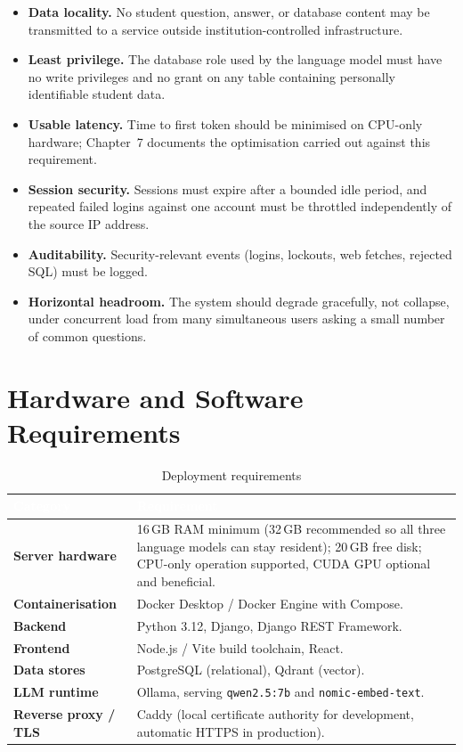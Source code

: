 \documentclass[11pt,a4paper,oneside]{report}
\begin{document}
\begin{itemize}[leftmargin=1.5em]
\item \textbf{Data locality.} No student question, answer, or database
      content may be transmitted to a service outside institution-controlled
      infrastructure.
\item \textbf{Least privilege.} The database role used by the language
      model must have no write privileges and no grant on any table
      containing personally identifiable student data.
\item \textbf{Usable latency.} Time to first token should be minimised on
      CPU-only hardware; Chapter~7 documents the optimisation carried out
      against this requirement.
\item \textbf{Session security.} Sessions must expire after a bounded idle
      period, and repeated failed logins against one account must be
      throttled independently of the source IP address.
\item \textbf{Auditability.} Security-relevant events (logins, lockouts,
      web fetches, rejected SQL) must be logged.
\item \textbf{Horizontal headroom.} The system should degrade gracefully,
      not collapse, under concurrent load from many simultaneous users
      asking a small number of common questions.
\end{itemize}

\section{Hardware and Software Requirements}

\begin{table}[h]
\centering
\caption{Deployment requirements}
\renewcommand{\arraystretch}{1.3}
\begin{tabularx}{\linewidth}{|>{\bfseries}p{3.4cm}|X|}
\hline
\rowcolor{hdrnavy}
\textcolor{white}{Category} & \textcolor{white}{Requirement} \\
\hline
Server hardware & 16\,GB RAM minimum (32\,GB recommended so all three
  language models can stay resident); 20\,GB free disk; CPU-only
  operation supported, CUDA GPU optional and beneficial. \\
\hline
Containerisation & Docker Desktop / Docker Engine with Compose. \\
\hline
Backend & Python 3.12, Django, Django REST Framework. \\
\hline
Frontend & Node.js / Vite build toolchain, React. \\
\hline
Data stores & PostgreSQL (relational), Qdrant (vector). \\
\hline
LLM runtime & Ollama, serving \texttt{qwen2.5:7b} and
  \texttt{nomic-embed-text}. \\
\hline
Reverse proxy / TLS & Caddy (local certificate authority for
  development, automatic HTTPS in production). \\
\hline
\end{tabularx}
\end{table}
\end{document}

